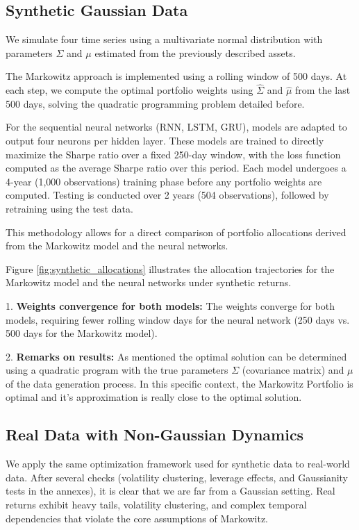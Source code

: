 \documentclass[11pt]{article}
\begin{document}
\subsection{Synthetic Gaussian Data}
\label{subsec:synthetic_results}

We simulate four time series using a multivariate normal distribution with parameters $\Sigma$ and $\mu$ estimated from the previously described assets.

The Markowitz approach is implemented using a rolling window of 500 days. At each step, we compute the optimal portfolio weights using $\hat{\Sigma}$ and $\hat{\mu}$ from the last 500 days, solving the quadratic programming problem detailed before.

For the sequential neural networks (RNN, LSTM, GRU), models are adapted to output four neurons per hidden layer. These models are trained to directly maximize the Sharpe ratio over a fixed 250-day window, with the loss function computed as the average Sharpe ratio over this period. Each model undergoes a 4-year (1,000 observations) training phase before any portfolio weights are computed. Testing is conducted over 2 years (504 observations), followed by retraining using the test data.

This methodology allows for a direct comparison of portfolio allocations derived from the Markowitz model and the neural networks.

Figure \ref{fig:synthetic_allocations} illustrates the allocation trajectories for the Markowitz model and the neural networks under synthetic returns. 

1. \textbf{Weights convergence for both models:}  
The weights converge for both models, requiring fewer rolling window days for the neural network (250 days vs. 500 days for the Markowitz model).

2. \textbf{Remarks on results:}  
As mentioned the optimal solution can be determined using a quadratic program with the true parameters $\Sigma$ (covariance matrix) and $\mu$ of the data generation process. In this specific context, the Markowitz Portfolio is optimal and it's approximation is really close to the optimal solution.



\subsection{Real Data with Non-Gaussian Dynamics}

We apply the same optimization framework used for synthetic data to real-world data. After several checks (volatility clustering, leverage effects, and Gaussianity tests in the annexes), it is clear that we are far from a Gaussian setting. Real returns exhibit heavy tails, volatility clustering, and complex temporal dependencies that violate the core assumptions of Markowitz.
\end{document}

